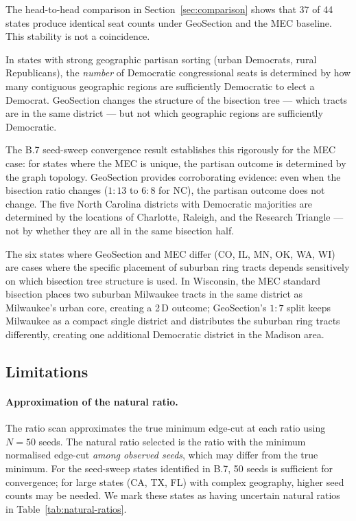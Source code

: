 The head-to-head comparison in Section~\ref{sec:comparison} shows that
37 of 44 states produce identical seat counts under GeoSection and the
MEC baseline.
This stability is not a coincidence.

In states with strong geographic partisan sorting (urban Democrats, rural
Republicans), the \emph{number} of Democratic congressional seats is
determined by how many contiguous geographic regions are sufficiently
Democratic to elect a Democrat.
GeoSection changes the structure of the bisection tree --- which tracts
are in the same district --- but not which geographic regions are
sufficiently Democratic.

The B.7 seed-sweep convergence result establishes this rigorously for
the MEC case: for states where the MEC is unique, the partisan outcome
is determined by the graph topology.
GeoSection provides corroborating evidence: even when the bisection ratio
changes ($1:13$ to $6:8$ for NC), the partisan outcome does not change.
The five North Carolina districts with Democratic majorities are determined
by the locations of Charlotte, Raleigh, and the Research Triangle ---
not by whether they are all in the same bisection half.

The six states where GeoSection and MEC differ (CO, IL, MN, OK, WA, WI)
are cases where the specific placement of suburban ring tracts depends
sensitively on which bisection tree structure is used.
In Wisconsin, the MEC standard bisection places two suburban Milwaukee
tracts in the same district as Milwaukee's urban core, creating a 2\,D
outcome; GeoSection's $1:7$ split keeps Milwaukee as a compact single
district and distributes the suburban ring tracts differently, creating
one additional Democratic district in the Madison area.

\subsection{Limitations}
\label{sec:limitations}

\paragraph{Approximation of the natural ratio.}
The ratio scan approximates the true minimum edge-cut at each ratio using
$N=50$ seeds.
The natural ratio selected is the ratio with the minimum normalised edge-cut
\emph{among observed seeds}, which may differ from the true minimum.
For the seed-sweep states identified in B.7, 50 seeds is sufficient for
convergence; for large states (CA, TX, FL) with complex geography, higher
seed counts may be needed.
We mark these states as having uncertain natural ratios in Table~\ref{tab:natural-ratios}.

